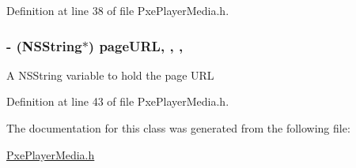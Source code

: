 Definition at line 38 of file Pxe\-Player\-Media.\-h.

\hypertarget{interface_pxe_player_media_a432762edad9b851c6644edf38e55fc80}{
\subsubsection[{page\-U\-R\-L}]{\setlength{\rightskip}{0pt plus 5cm}-\/ (N\-S\-String$\ast$) page\-U\-R\-L\hspace{0.3cm}{\ttfamily [read]}, {\ttfamily [write]}, {\ttfamily [nonatomic]}, {\ttfamily [strong]}}}\label{interface_pxe_player_media_a432762edad9b851c6644edf38e55fc80}
A N\-S\-String variable to hold the page U\-R\-L 

Definition at line 43 of file Pxe\-Player\-Media.\-h.



The documentation for this class was generated from the following file\-:\begin{DoxyCompactItemize}
\item 
\hyperlink{_pxe_player_media_8h}{Pxe\-Player\-Media.\-h}\end{DoxyCompactItemize}
